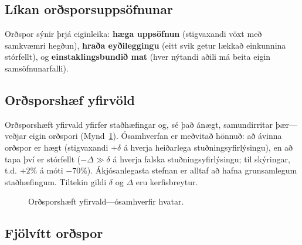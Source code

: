 \documentclass[11pt,a4paper,twocolumn]{article}
\begin{document}
\subsection{Líkan orðsporsuppsöfnunar}

Orðspor sýnir þrjá eiginleika: \textbf{hæga uppsöfnun} (stigvaxandi vöxt með samkvæmri hegðun), \textbf{hraða eyðileggingu} (eitt svik getur lækkað einkunnina stórfellt), og \textbf{einstaklingsbundið mat} (hver nýtandi aðili má beita eigin samsöfnunarfalli).

\subsection{Orðsporshæf yfirvöld}

Orðsporshæft yfirvald yfirfer staðhæfingar og, sé það ánægt, samundirritar þær---veðjar eigin orðspori (Mynd~\ref{fig:authority}). Ósamhverfan er meðvitað hönnuð: að ávinna orðspor er hægt (stigvaxandi $+\delta$ á hverja heiðarlega stuðningsyfirlýsingu), en að tapa því er stórfellt ($-\Delta \gg \delta$ á hverja falska stuðningsyfirlýsingu; til skýringar, t.d. $+2\%$ á móti $-70\%$). Ákjósanlegasta stefnan er alltaf að hafna grunsamlegum staðhæfingum. Tiltekin gildi $\delta$ og $\Delta$ eru kerfisbreytur.

\begin{figure}[ht]
\centering
{}
\caption{Orðsporshæft yfirvald---ósamhverfir hvatar.}
\label{fig:authority}
\end{figure}

\subsection{Fjölvítt orðspor}
\end{document}
